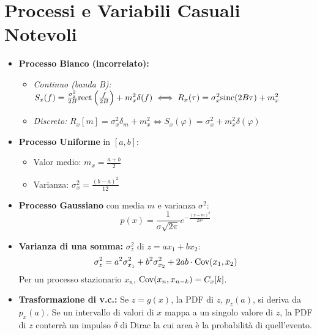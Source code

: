 \section{Processi e Variabili Casuali Notevoli}
\begin{itemize}
    \item \textbf{Processo Bianco (incorrelato):}
    \begin{itemize}
        \item \textit{Continuo (banda B):} $S_x(f) = \frac{\sigma_x^2}{2B} \text{rect}\left(\frac{f}{2B}\right) + m_x^2 \delta(f) \iff R_x(\tau) = \sigma_x^2 \text{sinc}(2B\tau) + m_x^2$
        \item \textit{Discreto:} $R_x[m] = \sigma_x^2 \delta_m + m_x^2 \iff S_x(\varphi) = \sigma_x^2 + m_x^2 \delta(\varphi)$
    \end{itemize}
    \item \textbf{Processo Uniforme} in $[a, b]$:
    \begin{itemize}
        \item Valor medio: $m_x = \frac{a+b}{2}$
        \item Varianza: $\sigma_x^2 = \frac{(b-a)^2}{12}$
    \end{itemize}
    \item \textbf{Processo Gaussiano} con media $m$ e varianza $\sigma^2$:
        \[ p(x) = \frac{1}{\sigma\sqrt{2\pi}} e^{-\frac{(x-m)^2}{2\sigma^2}} \]
    \item \textbf{Varianza di una somma:} $\sigma_z^2$ di $z = a x_1 + b x_2$:
        \[ \sigma_z^2 = a^2 \sigma_{x_1}^2 + b^2 \sigma_{x_2}^2 + 2ab \cdot \text{Cov}(x_1, x_2) \]
        Per un processo stazionario $x_n$, $\text{Cov}(x_n, x_{n-k}) = C_x[k]$.
    \item \textbf{Trasformazione di v.c.:} Se $z = g(x)$, la PDF di $z$, $p_z(a)$, si deriva da $p_x(a)$. Se un intervallo di valori di $x$ mappa a un singolo valore di $z$, la PDF di $z$ conterrà un impulso $\delta$ di Dirac la cui area è la probabilità di quell'evento.
\end{itemize}